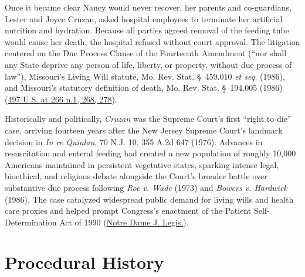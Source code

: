 \documentclass[12pt]{article}
\begin{document}
Once it became clear Nancy would never recover, her parents and co-guardians, Lester and Joyce Cruzan, asked hospital employees to terminate her artificial nutrition and hydration. Because all parties agreed removal of the feeding tube would cause her death, the hospital refused without court approval. The litigation centered on the Due Process Clause of the Fourteenth Amendment (``nor shall any State deprive any person of life, liberty, or property, without due process of law''), Missouri's Living Will statute, Mo. Rev. Stat. \S\ 459.010 \textit{et seq.} (1986), and Missouri's statutory definition of death, Mo. Rev. Stat. \S\ 194.005 (1986) (\href{https://supreme.justia.com/cases/federal/us/497/261/}{497 U.S. at 266 n.1, 268, 278}).

Historically and politically, \textit{Cruzan} was the Supreme Court's first ``right to die'' case, arriving fourteen years after the New Jersey Supreme Court's landmark decision in \textit{In re Quinlan}, 70 N.J. 10, 355 A.2d 647 (1976). Advances in resuscitation and enteral feeding had created a new population of roughly 10,000 Americans maintained in persistent vegetative states, sparking intense legal, bioethical, and religious debate alongside the Court's broader battle over substantive due process following \textit{Roe v. Wade} (1973) and \textit{Bowers v. Hardwick} (1986). The case catalyzed widespread public demand for living wills and health care proxies and helped prompt Congress's enactment of the Patient Self-Determination Act of 1990 (\href{https://scholarship.law.nd.edu/cgi/viewcontent.cgi?article=1280&context=jleg}{Notre Dame J. Legis.}).

\section{Procedural History}
\end{document}

